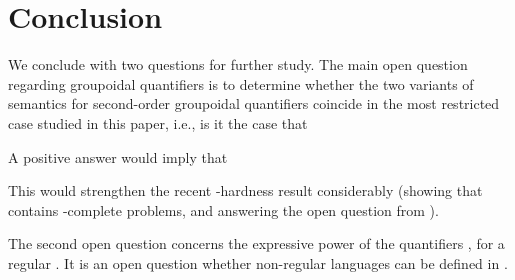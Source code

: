 \documentclass{LMCS}
\begin{document}
\section{Conclusion}
\noindent We conclude with two questions for further study.
The main open question regarding  groupoidal quantifiers is  to determine whether the two variants of
semantics for second-order groupoidal quantifiers coincide in the most restricted case studied in this paper, i.e., is it the case that

A positive answer would imply that

This would strengthen the recent -hardness result \cite{loh08} considerably (showing that  contains -complete problems, and answering the open question from \cite{MR1908783}).

The second open question concerns the expressive power of the quantifiers , for a  regular . It is an open question whether non-regular languages can be defined in   .



\end{document}
